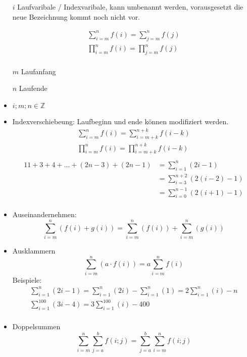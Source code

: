 \begin{itemize}
    \item[$i$] Laufvaribale / Indexvaribale, kann umbenannt werden, vorausgesetzt die neue Bezeichnung kommt noch nicht vor.
    \item[] \begin{gather*}
                \sum\limits_{i = m}^n f(i) = \sum\limits_{j = m}^n f(j)\\
                \prod\limits_{i = m}^n f(i) = \prod\limits_{j = m}^n f(j)\\
    \end{gather*}
    \item[$m$] Laufanfang
    \item[$n$] Laufende
    \item $i;m;n \in \mathbb{Z}$
    \item Indexverschiebeung: Laufbeginn und ende können modifiziert werden.
    \begin{gather*}
        \sum\limits_{i=m}^n f(i) = \sum\limits_{i=m+k}^{n+k} f(i-k)\\
        \prod\limits_{i=m}^n f(i) = \prod\limits_{i=m+k}^{n+k} f(i-k)\\
    \end{gather*}
    \begin{alignat*}{1}
        1+3+4+\dots+(2n-3)+(2n-1) & = \sum\limits_{i = 1}^n (2i-1)             \\
        & = \sum\limits_{i = 3}^{n + 2} (2(i - 2)-1) \\
        & = \sum\limits_{i = 0}^{n - 1} (2(i + 1)-1) \\
    \end{alignat*}
    \item Auseinandernehmen:
    \[\sum\limits_{i=m}^n (f(i) + g(i)) = \sum\limits_{i=m}^n (f(i)) + \sum\limits_{i=m}^n (g(i))\]
    \item Ausklammern
    \[\sum\limits_{i=m}^n (a \cdot f(i)) = a \sum\limits_{i=m}^n f(i)\]
    Beispiele:
    \begin{gather*}
        \sum\limits_{i=1}^n (2i-1) = \sum\limits_{i=1}^n (2i) - \sum\limits_{i=1}^n (1) = 2\sum\limits_{i=1}^n (i) - n\\
        \sum\limits_{i=1}^{100} (3i-4) = 3\sum\limits_{i=1}^{100} (i) - 400\\
    \end{gather*}
    \item Doppelsummen
    \[\sum\limits_{i=m}^n \sum\limits_{j=a}^b f(i; j) = \sum\limits_{j=a}^b \sum\limits_{i=m}^n f(i; j)\]
\end{itemize}
